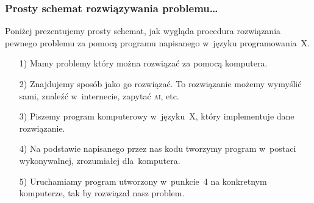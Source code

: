 \documentclass[10pt,t]{beamer}
\begin{document}
\begin{frame}
  \frametitle{Prosty schemat rozwiązywania problemu\ldots}


  Poniżej prezentujemy prosty schemat, jak wygląda procedura
  rozwiązania pewnego problemu za pomocą programu napisanego w~języku
  programowania~X.


  \begin{enumerate}
    \setlength{\itemsep}{1em}

  \item[1)] Mamy problemy który można rozwiązać za pomocą komputera.



  \item[2)] Znajdujemy sposób jako go rozwiązać. To rozwiązanie możemy
    wymyślić sami, znaleźć w~internecie, zapytać \textsc{ai}, etc.



  \item[3)] Piszemy program komputerowy w~języku~X, który implementuje
    dane rozwiązanie.



  \item[4)] Na podstawie napisanego przez nas kodu tworzymy program
    w~postaci wykonywalnej, zrozumiałej dla~komputera.



  \item[5)] Uruchamiamy program utworzony w~punkcie~4 na konkretnym
    komputerze, tak by rozwiązał nasz problem.

  \end{enumerate}

\end{frame}
\end{document}
